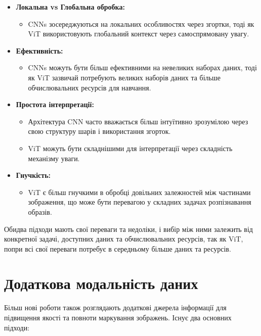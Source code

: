 \documentclass{udstu}
\begin{document}
\begin{itemize}
    \item \textbf{Локальна vs Глобальна обробка:}
    \begin{itemize}
        \item CNNs зосереджуються на локальних особливостях через згортки, тоді як ViT використовують глобальний контекст через самоспрямовану увагу.
    \end{itemize}

    \item \textbf{Ефективність:}
    \begin{itemize}
        \item CNNs можуть бути більш ефективними на невеликих наборах даних, тоді як ViT зазвичай потребують великих наборів даних та більше обчислювальних ресурсів для навчання.
    \end{itemize}

    \item \textbf{Простота інтерпретації:}
    \begin{itemize}
        \item Архітектура CNN часто вважається більш інтуїтивно зрозумілою через свою структуру шарів і використання згорток.
        \item ViT можуть бути складнішими для інтерпретації через складність механізму уваги.
    \end{itemize}

    \item \textbf{Гнучкість:}
    \begin{itemize}
        \item ViT є більш гнучкими в обробці довільних залежностей між частинами зображення, що може бути перевагою у складних задачах розпізнавання образів.
    \end{itemize}
\end{itemize}

Обидва підходи мають свої переваги та недоліки, і вибір між ними залежить від конкретної задачі,
доступних даних та обчислювальних ресурсів, так як ViT, попри всі свої переваги потребує в середньому
більше даних та ресурсів.

\section{Додаткова модальність даних}

Більш нові роботи також розглядають додаткові джерела інформації для підвищення якості та повноти
маркування зображень. Існує два основних підходи:
\end{document}
